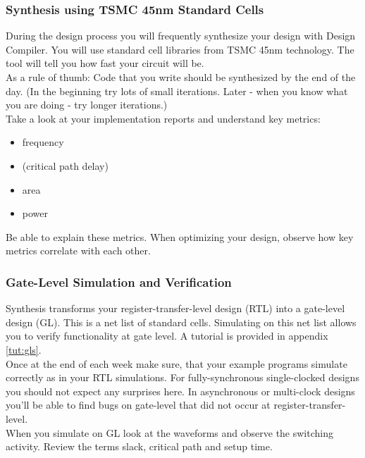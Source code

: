 \subsubsection{Synthesis using TSMC 45nm Standard Cells}
During the design process you will frequently synthesize your design with Design Compiler. You will use standard cell libraries from TSMC 45nm technology. The tool will tell you how fast your circuit will be.\\
As a rule of thumb: Code that you write should be synthesized by the end of the day. (In the beginning try lots of small iterations. Later - when you know what you are doing - try longer iterations.)\\
Take a look at your implementation reports and understand key metrics:
\begin{itemize}
\item frequency
\item (critical path delay)
\item area
\item power
\end{itemize} Be able to explain these metrics. When optimizing your design, observe how key metrics correlate with each other.

\subsubsection{Gate-Level Simulation and Verification}
Synthesis transforms your register-transfer-level design (RTL) into a gate-level design (GL). This is a net list of standard cells. Simulating on this net list allows you to verify functionality at gate level. A tutorial is provided in appendix \ref{tut:gls}.\\
Once at the end of each week make sure, that your example programs simulate correctly as in your RTL simulations. For fully-synchronous single-clocked designs you should not expect any surprises here. In asynchronous or multi-clock designs you'll be able to find bugs on gate-level that did not occur at register-transfer-level.\\
When you simulate on GL look at the waveforms and observe the switching activity. Review the terms slack, critical path and setup time.





\newpage
